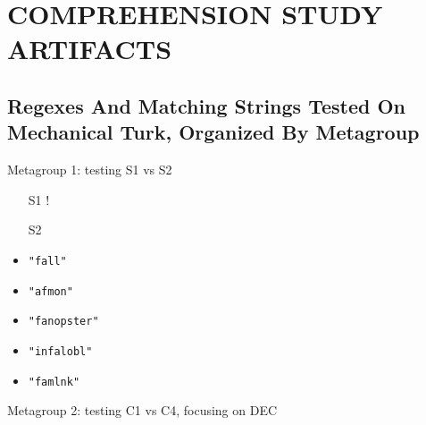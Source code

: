 \chapter{COMPREHENSION STUDY ARTIFACTS}
\label{ch12}
\section*{Regexes And Matching Strings Tested On Mechanical Turk, Organized By Metagroup}
\label{app:MTstudyInput}
\begin{footnotesize}
Metagroup 1: testing S1 vs S2
\vspace{-5mm}
\begin{multicols}{3}
\begin{itemize}[noitemsep,topsep=0pt]
\item[S1] \cverb!%
\item[S2] 
\item[] \verb|"fall"|
\item[] \verb|"afmon"|
\item[] \verb|"fanopster"|
\item[] \verb|"infalobl"|
\item[] \verb|"famlnk"|
\end{itemize}
\end{multicols}
\vspace{-2mm}
Metagroup 2: testing C1 vs C4, focusing on DEC

\end{footnotesize}
